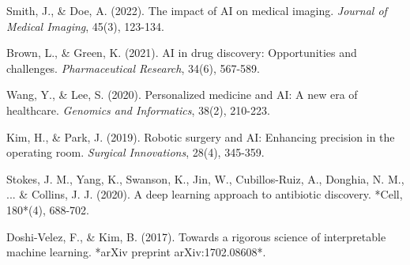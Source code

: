 \documentclass[12pt, a4paper]{article}
\begin{document}
\begin{thebibliography}{9}
Smith, J., \& Doe, A. (2022). The impact of AI on medical imaging. \textit{Journal of Medical Imaging}, 45(3), 123-134.

Brown, L., \& Green, K. (2021). AI in drug discovery: Opportunities and challenges. \textit{Pharmaceutical Research}, 34(6), 567-589.

Wang, Y., \& Lee, S. (2020). Personalized medicine and AI: A new era of healthcare. \textit{Genomics and Informatics}, 38(2), 210-223.

Kim, H., \& Park, J. (2019). Robotic surgery and AI: Enhancing precision in the operating room. \textit{Surgical Innovations}, 28(4), 345-359.

Stokes, J. M., Yang, K., Swanson, K., Jin, W., Cubillos-Ruiz, A., Donghia, N. M., ... \& Collins, J. J. (2020). A deep learning approach to antibiotic discovery. *Cell, 180*(4), 688-702.

Doshi-Velez, F., \& Kim, B. (2017). Towards a rigorous science of interpretable machine learning. *arXiv preprint arXiv:1702.08608*.

\end{thebibliography}
\end{document}
